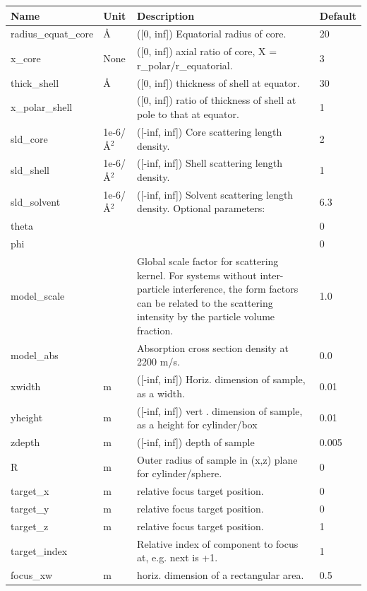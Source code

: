 \begin{longtable}{p{}p{}p{}p{}}
\toprule
\textbf{Name} & \textbf{Unit} & \textbf{Description} & \textbf{Default} \\
\midrule
\endhead
radius\_equat\_core & \AA{} & ([0, inf]) Equatorial radius of core. & 20 \\
x\_core & None & ([0, inf]) axial ratio of core, X = r\_polar/r\_equatorial. & 3 \\
thick\_shell & \AA{} & ([0, inf]) thickness of shell at equator. & 30 \\
x\_polar\_shell &  & ([0, inf]) ratio of thickness of shell at pole to that at equator. & 1 \\
sld\_core & 1e-6/\AA{}$^{2}$ & ([-inf, inf]) Core scattering length density. & 2 \\
sld\_shell & 1e-6/\AA{}$^{2}$ & ([-inf, inf]) Shell scattering length density. & 1 \\
sld\_solvent & 1e-6/\AA{}$^{2}$ & ([-inf, inf]) Solvent scattering length density. Optional parameters: & 6.3 \\
theta &  &  & 0 \\
phi &  &  & 0 \\
model\_scale &   & Global scale factor for scattering kernel. For systems without inter-particle interference, the form factors can be related to the scattering intensity by the particle volume fraction. & 1.0 \\
model\_abs &   & Absorption cross section density at 2200 m/s. & 0.0 \\
xwidth & m & ([-inf, inf]) Horiz. dimension of sample, as a width. & 0.01 \\
yheight & m & ([-inf, inf]) vert . dimension of sample, as a height for cylinder/box & 0.01 \\
zdepth & m & ([-inf, inf]) depth of sample & 0.005 \\
R & m & Outer radius of sample in (x,z) plane for cylinder/sphere. & 0 \\
target\_x & m & relative focus target position. & 0 \\
target\_y & m & relative focus target position. & 0 \\
target\_z & m & relative focus target position. & 1 \\
target\_index &   & Relative index of component to focus at, e.g. next is +1. & 1 \\
focus\_xw & m & horiz. dimension of a rectangular area. & 0.5 \\

\end{longtable}

